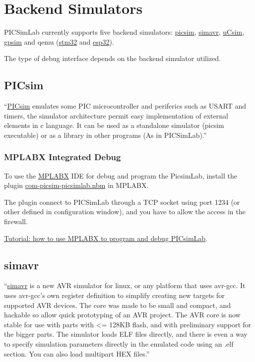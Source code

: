 \chapter{Backend Simulators}


PICSimLab currently supports five backend simulators:
\href{https://github.com/lcgamboa/picsim}{picsim},  
\href{https://github.com/buserror/simavr}{simavr}, 
\href{http://mazsola.iit.uni-miskolc.hu/\%7edrdani/embedded/ucsim/}{uCsim}, 
\href{http://gpsim.sourceforge.net/}{gpsim} and 
qemu (\href{https://beckus.github.io/qemu_stm32/}{stm32} and \href{https://github.com/a159x36/qemu}{esp32}).


The type of debug interface depends on the backend simulator utilized.

\section{PICsim} \hypertarget{def:PICSim}{}

``\href{https://github.com/lcgamboa/picsim}{PICsim} emulates some PIC microcontroller and periferics such as USART and timers, the simulator architecture permit easy implementation of external elements in c language. It can be used as a standalone simulator (picsim executable) or as a library in other programs (As in PICSimLab).''


\subsection{MPLABX Integrated Debug } \hypertarget{def:mplabxd}{}

To use the \href{http://www.microchip.com/mplabx}{MPLABX} IDE for debug and program the PicsimLab, install the plugin \href{https://github.com/lcgamboa/picsimlab_md/releases/}{com-picsim-picsimlab.nbm} in MPLABX.

The plugin connect to PICSimLab through a TCP socket using port 1234 (or other defined in configuration window), and you have to allow the access in the firewall.

\href{https://lcgamboa.github.io/picsimlab_docs/stable/UsewithMPLABX.html}{Tutorial: how to use MPLABX to program and debug PICsimLab}.


\section{simavr}\hypertarget{def:simavr}{}

``\href{https://github.com/buserror/simavr}{simavr} is a new AVR simulator for linux, or any platform that uses avr-gcc. It uses avr-gcc's own register definition to simplify creating new targets for supported AVR devices. The core was made to be small and compact, and hackable so allow quick prototyping of an AVR project. The AVR core is now stable for use with parts with <= 128KB flash, and with preliminary support for the bigger parts. The simulator loads ELF files directly, and there is even a way to specify simulation parameters directly in the emulated code using an .elf section. You can also load multipart HEX files.''

